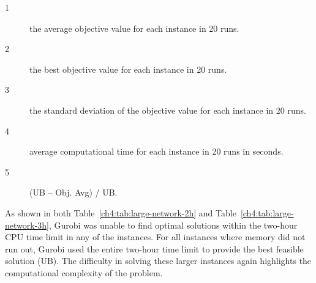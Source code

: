 \begin{landscape}
\begin{description}
\item[1]
the average objective value for each instance in 20 runs.
\item[2]
the best objective value for each instance in 20 runs.
\item[3]
the standard deviation of the objective value for each instance in 20 runs.
\item[4]
average computational time for each instance in 20 runs in seconds.
\item[5]
(UB -- Obj. Avg) / UB.
\end{description}
\end{landscape}

As shown in both Table~\ref{ch4:tab:large-network-2h} and Table~\ref{ch4:tab:large-network-3h}, Gurobi was unable to find optimal solutions within the
two-hour CPU time limit in any of the instances. For all instances where memory did not run out,
Gurobi used the entire two-hour time limit to provide the best feasible solution (UB). The
difficulty in solving these larger instances again highlights the computational complexity of the
problem.

